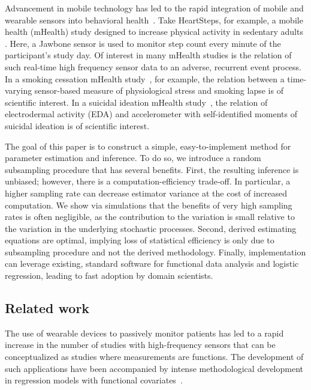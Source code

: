 \documentclass[12pt]{amsart}
\newenvironment{newmaterial}{\color{blue}}{\par}
\begin{document}
Advancement in mobile technology has led to the rapid integration of mobile and wearable sensors into behavioral health~\citep{Freeetal2013}. Take HeartSteps, for example, a mobile health (mHealth) study designed to increase physical activity in sedentary adults \citep{KlasnjaHS2019}. Here, a Jawbone sensor is used to monitor step count every minute of the participant's study day. Of interest in many mHealth studies is the relation of such real-time high frequency sensor data to an adverse, recurrent event process. In a smoking cessation mHealth study~\citep{Sense2Stop}, for example, the relation between a time-varying sensor-based measure of physiological stress and smoking lapse is of scientific interest. In a suicidal ideation mHealth study~\citep{Kleiman2018}, the relation of electrodermal activity (EDA) and accelerometer with self-identified moments of suicidal ideation is of scientific interest.

The goal of this paper is to construct a simple, easy-to-implement method for parameter estimation and inference.
To do so, we introduce a random subsampling procedure that has several benefits.  First, the resulting inference is unbiased; however, there is a computation-efficiency trade-off. In particular, a higher sampling rate can decrease estimator variance at the cost of increased computation.  We show via simulations that the benefits of very high sampling rates is often negligible, as the contribution to the variation is small relative to the variation in the underlying stochastic processes. Second, derived estimating equations are optimal, implying loss of statistical efficiency is only due to subsampling procedure and not the derived methodology.  Finally, implementation can leverage existing, standard software for functional data analysis and logistic regression, leading to fast adoption by domain scientists.

\subsection{Related work}

The use of wearable devices to passively monitor patients has led to a rapid increase in the number of studies with high-frequency sensors that can be conceptualized as studies where measurements are functions.
The development of such applications have been accompanied by intense methodological development in regression models with functional covariates~\citep{James2002,JamesSilverman2005,muller2005,Ramsay2005,kokoszka2017,doi:10.1198/jasa.2009.tm08564,doi:10.1198/016214507000000527}.
\end{document}
